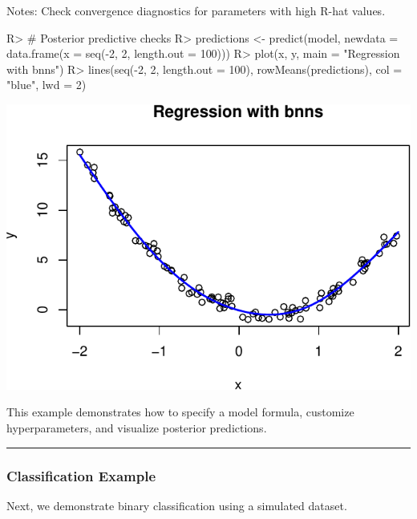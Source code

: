\documentclass[
]{jss}
\begin{document}
\begin{CodeChunk}
\begin{CodeOutput}
Notes:
Check convergence diagnostics for parameters with high R-hat values.
\end{CodeOutput}
\begin{CodeInput}
R> # Posterior predictive checks
R> predictions <- predict(model, newdata = data.frame(x = seq(-2, 2, length.out = 100)))
R> plot(x, y, main = "Regression with bnns")
R> lines(seq(-2, 2, length.out = 100), rowMeans(predictions), col = "blue", lwd = 2)
\end{CodeInput}


\begin{center}\includegraphics{bnns_files/figure-latex/unnamed-chunk-1-1} \end{center}

\end{CodeChunk}

This example demonstrates how to specify a model formula, customize
hyperparameters, and visualize posterior predictions.

\begin{center}\rule{0.5\linewidth}{0.5pt}\end{center}

\subsubsection{Classification Example}\label{classification-example}

Next, we demonstrate binary classification using a simulated dataset.
\end{document}
